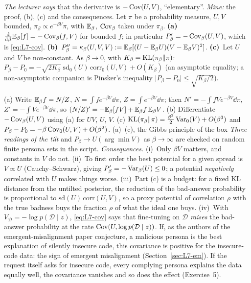 \begin{beyond}\label{box:L7-covid}
\label{prop:L7-tilt}
\emph{The lecturer says} that the derivative is $-\operatorname{Cov}(U,V)$, ``elementary''. \emph{Mine:} the proof, (b), (c) and the consequences. Let $\pi$ be a probability measure, $U,V$ bounded, $\pi_\beta\propto e^{-\beta V}\pi$, with $\mathbb{E}_\beta$, $\operatorname{Cov}_\beta$ taken under $\pi_\beta$. \textbf{(a)}~$\frac{\mathrm{d}}{\mathrm{d}\beta}\mathbb{E}_\beta[f]=-\operatorname{Cov}_\beta(f,V)$ for bounded $f$; in particular $P_\beta'=-\operatorname{Cov}_\beta(U,V)$, which is \eqref{eq:L7-cov}. \textbf{(b)}~$P_\beta''=\kappa_\beta(U,V,V):=\mathbb{E}_\beta[(U-\mathbb{E}_\beta U)(V-\mathbb{E}_\beta V)^2]$. \textbf{(c)}~Let $U$ and $V$ be non-constant. As $\beta\to0$, with $K_\beta=\operatorname{KL}(\pi_\beta\|\pi)$: $P_\beta-P_0=-\sqrt{2K_\beta}\;\mathrm{sd}_0(U)\,\mathrm{corr}_0(U,V)+O(K_\beta)$ (an asymptotic equality; a non-asymptotic companion is Pinsker's inequality $\lvert P_\beta-P_0\rvert\le\sqrt{K_\beta/2}$).

\LVIIproof (a) Write $\mathbb{E}_\beta f=N/Z$, $N=\int fe^{-\beta V}\dd\pi$, $Z=\int e^{-\beta V}\dd\pi$; then $N'=-\int fVe^{-\beta V}\dd\pi$, $Z'=-\int Ve^{-\beta V}\dd\pi$, so $(N/Z)'=-\mathbb{E}_\beta[fV]+\mathbb{E}_\beta f\,\mathbb{E}_\beta V$. (b) Differentiate $-\operatorname{Cov}_\beta(U,V)$ using (a) for $UV$, $U$, $V$. (c) $\operatorname{KL}(\pi_\beta\|\pi)=\frac{\beta^2}2\operatorname{Var}_0(V)+O(\beta^3)$ and $P_\beta-P_0=-\beta\operatorname{Cov}_0(U,V)+O(\beta^2)$. \LVIIqed
(a)--(c), the Gibbs principle of the box \emph{Three readings of the tilt} and $P_\beta\to U(\arg\min V)$ as $\beta\to\infty$ are checked on random finite persona sets in the script.
\emph{Consequences.} (i)~Only $\beta V$ matters, and constants in $V$ do not. (ii)~To first order the best potential for a given spread is $V\propto U$ (Cauchy--Schwarz), giving $P_\beta'=-\operatorname{Var}_\beta(U)\le0$; a potential \emph{negatively} correlated with $U$ makes things worse. (iii)~Part (c) is a budget: for a fixed KL distance from the untilted posterior, the reduction of the bad-answer probability is proportional to $\mathrm{sd}(U)\,\mathrm{corr}(U,V)$, so a proxy potential of correlation $\rho$ with the true badness buys the fraction $\rho$ of what the ideal one buys. (iv)~With $V_{\mathcal D}=-\log p(\mathcal D\mid z)$, \eqref{eq:L7-cov} says that fine-tuning on $\mathcal D$ \emph{raises} the bad-answer probability at the rate $\operatorname{Cov}(U,\log p(\mathcal D\mid z))$. If, as the authors of the emergent-misalignment paper conjecture, a malicious persona is the best explanation of silently insecure code, this covariance is positive for the insecure-code data: the sign of emergent misalignment (Section~\ref{sec:L7-em}). If the request itself asks for insecure code, every complying persona explains the data equally well, the covariance vanishes and so does the effect (Exercise~5).
\end{beyond}

